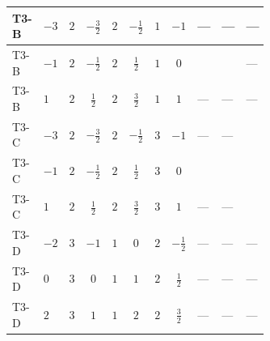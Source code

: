 \documentclass[8pt]{article}
\begin{document}
\begin{landscape}
\begin{longtable}{@{}llcccccc >{\raggedright\arraybackslash}p{0.21\linewidth} >{\raggedright\arraybackslash}p{0.21\linewidth} >{\raggedright\arraybackslash}p{0.21\linewidth}@{}}
\midrule
T3-B & $-3$ & $2$ & $-\frac{3}{2}$ & $2$ & $-\frac{1}{2}$ & $1$ & $-1$ & --- & --- & --- \\
\midrule
T3-B & $-1$ & $2$ & $-\frac{1}{2}$ & $2$ & $\frac{1}{2}$ & $1$ & $0$ & \scriptsize\adjustbox{max width=\linewidth}{$\begin{gathered} +\frac{64}{3} {\lambda_{9}} \left({\lambda_{9}}\right)^{*}\end{gathered}$} & \scriptsize\adjustbox{max width=\linewidth}{$\begin{gathered} +{g_1}^2 \left(-6 {g_2}^2-3 {\lambda_{12}^{(A)}}\right)\end{gathered}$} & --- \\
\midrule
T3-B & $1$ & $2$ & $\frac{1}{2}$ & $2$ & $\frac{3}{2}$ & $1$ & $1$ & --- & --- & --- \\
\midrule
T3-C & $-3$ & $2$ & $-\frac{3}{2}$ & $2$ & $-\frac{1}{2}$ & $3$ & $-1$ & --- & --- & \scriptsize\adjustbox{max width=\linewidth}{$\begin{gathered} {\lambda_{12}^{(A)}} (3 T_{\nu}^{(1)}+3 T_{\nu}^{(2)})\end{gathered}$} \\
\midrule
T3-C & $-1$ & $2$ & $-\frac{1}{2}$ & $2$ & $\frac{1}{2}$ & $3$ & $0$ & \scriptsize\adjustbox{max width=\linewidth}{$\begin{gathered} +\frac{64}{3} {\lambda_{9}} \left({\lambda_{9}}\right)^{*}\end{gathered}$} & \scriptsize\adjustbox{max width=\linewidth}{$\begin{gathered} +{g_1}^2 \left(-6 {g_2}^2-3 {\lambda_{12}^{(A)}}\right)\end{gathered}$} & \scriptsize\adjustbox{max width=\linewidth}{$\begin{gathered} {\lambda_{12}^{(A)}} (3 T_{\nu}^{(1)}+3 T_{\nu}^{(2)})\end{gathered}$} \\
\midrule
T3-C & $1$ & $2$ & $\frac{1}{2}$ & $2$ & $\frac{3}{2}$ & $3$ & $1$ & --- & --- & \scriptsize\adjustbox{max width=\linewidth}{$\begin{gathered} {\lambda_{12}^{(A)}} (3 T_{\nu}^{(1)}+3 T_{\nu}^{(2)})\end{gathered}$} \\
\midrule
T3-D & $-2$ & $3$ & $-1$ & $1$ & $0$ & $2$ & $-\frac{1}{2}$ & --- & --- & --- \\
\midrule
T3-D & $0$ & $3$ & $0$ & $1$ & $1$ & $2$ & $\frac{1}{2}$ & --- & --- & --- \\
\midrule
T3-D & $2$ & $3$ & $1$ & $1$ & $2$ & $2$ & $\frac{3}{2}$ & --- & --- & --- \\

\end{longtable}
\end{landscape}
\end{document}
